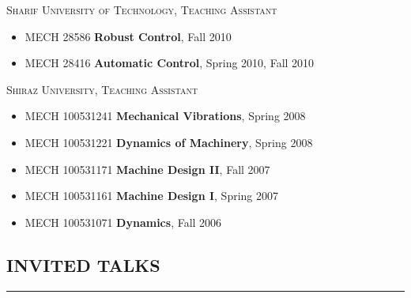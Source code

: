 \documentclass{article}
\begin{document}
\vspace{-5pt}

\noindent
\textsc{Sharif University of Technology}, \hfill \textsc{Teaching Assistant}
\vspace{-5pt}
\begin{itemize}
\setlength\itemsep{-2 pt}
\item[] MECH 28586 \textbf{Robust Control}, \hfill  Fall 2010
\item[] MECH 28416 \textbf{Automatic Control}, \hfill  Spring 2010, Fall 2010
\end{itemize}

\vspace{-5pt}

\noindent
\textsc{Shiraz University}, \hfill \textsc{Teaching Assistant}
\vspace{-5pt}
\begin{itemize}
\setlength\itemsep{-2 pt}
\item[] MECH 100531241 \textbf{Mechanical Vibrations}, \hfill Spring 2008
\item[] MECH 100531221 \textbf{Dynamics of Machinery}, \hfill Spring 2008
\item[] MECH 100531171 \textbf{Machine Design II}, \hfill Fall 2007
\item[] MECH 100531161 \textbf{Machine Design I}, \hfill Spring 2007
\item[] MECH 100531071 \textbf{Dynamics}, \hfill Fall 2006
\end{itemize}


\vspace{-5pt}



\subsection*{INVITED TALKS}
\vspace{-2pt}
\hrule
\vspace{10pt}

\end{document}
